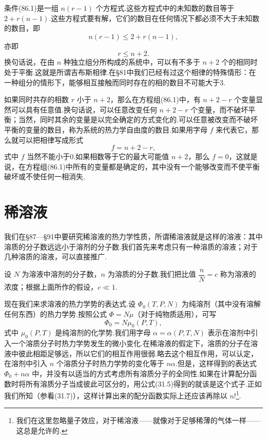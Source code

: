 条件(86.1)是一组 $n(r-1)$ 个方程式.这些方程式中的未知数的数目等于 $2+r(n-1)$.这些方程式要有解，它们的数目在任何情况下都必须不大于未知数的数目，即
\begin{equation*}
  n(r-1)\leqslant2+r(n-1),
\end{equation*}
亦即
\begin{equation}
  r\leqslant n+2.
\end{equation}
换句话说，在由 $n$ 种独立组分所构成的系统中，可以有不多于 $n+2$ 个的相同时处于平衡.这就是所谓吉布斯相律.在§81中我们已经有过这个相律的特殊情形：在一种组分的情形下，能够相互接触而同时存在的相的数目不可能大于3.

如果同时共存的相数 $r$ 小于 $n+2$，那么在方程组(86.1)中，有 $n+2-r$ 个变量显然可以具有任意值.换句话说，可以任意改变任何 $n+2-r$ 个变量，而不破坏平衡；当然，同时其余的变量是以完全确定的方式变化的.可以任意被改变而不破坏平衡的变量的数目，称为系统的热力学自由度的数目.如果用字母 $f$ 来代表它，那么就可以把相律写成形式
\begin{equation}
  f=n+2-r,
\end{equation}
式中 $f$ 当然不能小于0.如果相数等于它的最大可能值 $n+2$，那么 $f=0$，这就是说，在方程组(86.1)中所有的变量都是确定的，其中没有一个能够改变而不使平衡破坏或不使任何一相消失.

\section{稀溶液}

我们在§87—§91中要研究稀溶液的热力学性质，所谓稀溶液就是这样的溶液：其中溶质的分子数远远小于溶剂的分子数.我们首先来考虑只有一种溶质的溶液；对于几种溶质的溶液，可以直接推广.

设 $N$ 为溶液中溶剂的分子数，$n$ 为溶质的分子数.我们把比值 $\dfrac{n}{N}=c$ 称为溶液的浓度；根据上面所作的假设，$c\ll1$.

现在我们来求溶液的热力学势的表达式.设 $\varPhi_0(T,P,N)$ 为纯溶剂（其中没有溶解任何东西）的热力学势.按照公式 $\varPhi=N\mu$（对于纯物质适用），可写
\begin{equation*}
  \varPhi_0=N\mu_0(P,T),
\end{equation*}
式中 $\mu_0(P,T)$ 是纯溶剂的化学势.我们用字母 $\alpha=\alpha(P,T,N)$ 表示在溶剂中引入一个溶质分子时热力学势发生的微小变化.在稀溶液的假定下，溶质的分子在溶液中彼此相距足够远，所以它们的相互作用很弱.略去这个相互作用，可以认定，在溶剂中引入 $n$ 个溶质分子时热力学势的变化等于 $n\alpha$.但是，这样得到的表达式 $\varPhi_0+n\alpha$ 中，并没有以适当的方式考虑所有溶质分子的全同性.如果在计算配分函数时将所有溶质分子当成彼此可区分的，用公式(31.5)得到的就该是这个式子.正如我们所知（参看(31.7)），这样计算出来的配分函数实际上还应该再除以 $n$!\footnote{我们在这里忽略量子效应，对于稀溶液——就像对于足够稀薄的气体一样——这总是允许的.}.

